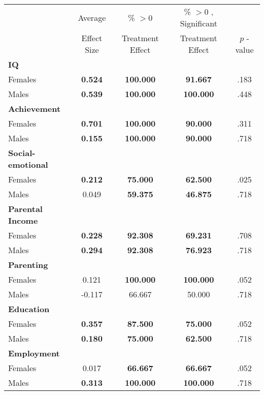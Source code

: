 \begin{tabular}{l c c c c}
\toprule
 & Average & \% $ >0 $ & \% $ >0 $ , Significant & \citet{Rosenbaum_2005_Distribution_JRSS} \\
 & Effect Size & Treatment Effect & Treatment Effect & $ p $ -value \\
\midrule
\textbf{IQ} & & & & \\
\quad Females &  \textbf{    0.524} & \textbf{  100.000} & \textbf{   91.667} & .183 \\
\quad Males &  \textbf{    0.539} & \textbf{  100.000} & \textbf{  100.000} & .448 \\
\midrule
\textbf{Achievement} & & & & \\
\quad Females &  \textbf{    0.701} & \textbf{  100.000} & \textbf{   90.000} & .311 \\
\quad Males &  \textbf{    0.155} & \textbf{  100.000} & \textbf{   90.000} & .718 \\
\midrule
\textbf{Social-emotional} & & & & \\
\quad Females &  \textbf{    0.212} & \textbf{   75.000} & \textbf{   62.500} & .025 \\
\quad Males &      0.049 & \textbf{   59.375} & \textbf{   46.875} & .718 \\
\midrule
\textbf{Parental Income} & & & & \\
\quad Females &  \textbf{    0.228} & \textbf{   92.308} & \textbf{   69.231} & .708 \\
\quad Males &  \textbf{    0.294} & \textbf{   92.308} & \textbf{   76.923} & .718 \\
\midrule
\textbf{Parenting} & & & & \\
\quad Females &      0.121 & \textbf{  100.000} & \textbf{  100.000} & .052 \\
\quad Males &     -0.117 &    66.667 &    50.000 & .718 \\
\midrule
\textbf{Education} & & & & \\
\quad Females &  \textbf{    0.357} & \textbf{   87.500} & \textbf{   75.000} & .052 \\
\quad Males &  \textbf{    0.180} & \textbf{   75.000} & \textbf{   62.500} & .718 \\
\midrule
\textbf{Employment} & & & & \\
\quad Females &      0.017 & \textbf{   66.667} & \textbf{   66.667} & .052 \\
\quad Males &  \textbf{    0.313} & \textbf{  100.000} & \textbf{  100.000} & .718 \\

\end{tabular}
